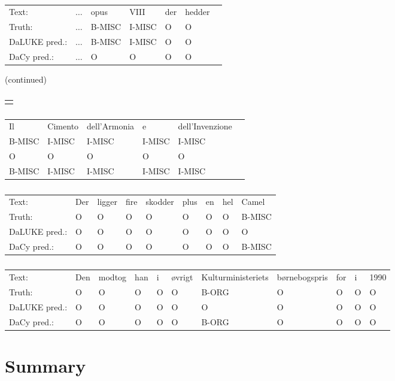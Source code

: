 \documentclass[main.tex]{subfiles}
\begin{document}
\begin{table}[H]
    \footnotesize
    \begin{tabular}{l|llllll}
        Text:             & $\ldots$  & opus    & VIII    & der  & hedder  \\
        Truth:            & $\ldots$  & B-MISC  & I-MISC  & O    & O       \\\hline
        DaLUKE pred.:     & $\ldots$  & B-MISC  & I-MISC  & O    & O       \\
        DaCy pred.:       & $\ldots$  & O       & O       & O    & O       
    \end{tabular}
    (continued)\\
    \begin{tabular}{c} %
        \quad \quad \quad \quad \quad \quad \quad \quad \quad \quad \quad \quad \quad \quad \quad \quad \quad \quad 
    \end{tabular}
                \begin{tabular}{llllll}
                     Il      & Cimento  & dell'Armonia  & e       & dell'Invenzione \\
                     B-MISC  & I-MISC   & I-MISC        & I-MISC  & I-MISC          \\\hline
                     O       & O        & O             & O       & O               \\
                     B-MISC  & I-MISC   & I-MISC        & I-MISC  & I-MISC          
                \end{tabular}\par
    \begin{tabular}{l|llllllll}
        Text:             & Der  & ligger  & fire  & skodder  & plus  & en  & hel  & Camel   \\ 
        Truth:            & O    & O       & O     & O        & O     & O   & O    & B-MISC  \\\hline
        DaLUKE pred.:     & O    & O       & O     & O        & O     & O   & O    & O       \\ 
        DaCy pred.:    & O    & O       & O     & O        & O     & O   & O    & B-MISC
    \end{tabular}\par
    \begin{tabular}{l|llllllllll}
        Text:            & Den  & modtog  & han  & i  & øvrigt  & Kulturministeriets  & børnebogspris  & for  & i  & 1990 \\
        Truth:           & O    & O       & O    & O  & O       & B-ORG               & O              & O    & O  & O    \\\hline
        DaLUKE  pred.:   & O    & O       & O    & O  & O       & O                   & O              & O    & O  & O    \\
        DaCy pred.:   & O    & O       & O    & O  & O       & B-ORG               & O              & O    & O  & O    
    \end{tabular}
    \caption{
    }
    \label{tab:dacyex}
\end{table}\noindent

\section{Summary}
\end{document}
